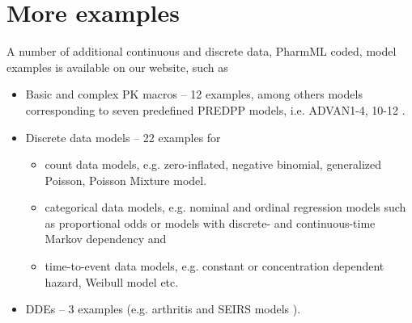 \section{More examples}
A number of additional continuous and discrete data, PharmML coded, model examples is available on our website, 
such as
\begin{itemize}
\item
Basic and complex PK macros -- 12 examples, among others models corresponding to seven predefined 
PREDPP models, i.e. ADVAN1-4, 10-12 \cite{NONMEM:2009}.
\item
Discrete data models -- 22 examples for 
\begin{itemize}
\item
count data models, e.g. zero-inflated, negative binomial, generalized Poisson, Poisson Mixture model. 
\item
categorical data models, e.g. nominal and ordinal regression models such as proportional odds or models with 
discrete- and continuous-time Markov dependency and 
\item
time-to-event data models, e.g. constant or concentration dependent hazard, Weibull model etc.
\end{itemize}
\item
DDEs -- 3 examples (e.g. arthritis and SEIRS models \cite{MLXTRANforMonolix:2014}).
\end{itemize}



